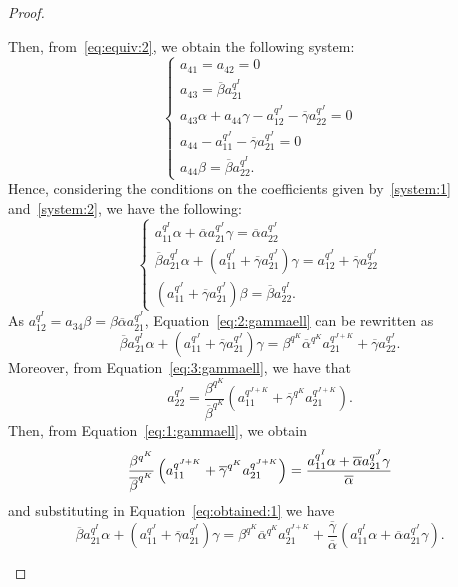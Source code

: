 \documentclass[11pt]{article}
\theoremstyle{definition}
\numberwithin{equation}{section}
\begin{document}
\begin{proof}
\begin{enumerate}
Then, from~\eqref{eq:equiv:2}, we obtain the following system:
\begin{equation}
\label{system:2}
    \begin{cases}
        a_{41} = a_{42} = 0\\
        a_{43} = \overline{\beta}a_{21}^{q^I}\\
        a_{43}\alpha + a_{44}\gamma - a_{12}^{q^J} - \overline{\gamma}a_{22}^{q^J} = 0\\
        a_{44} - a_{11}^{q^J} - \overline{\gamma}a_{21}^{q^J} = 0\\
        a_{44}\beta = \overline{\beta}a_{22}^{q^I}.
    \end{cases}
\end{equation}
Hence, considering the conditions on the coefficients {given by~\eqref{system:1} and~\eqref{system:2},} 
we have the following:
   $$ \begin{cases}
    a_{11}^{q^I}\alpha + \overline{\alpha}a_{21}^{q^J}\gamma = \overline{\alpha}a_{22}^{q^J} \label{eq:1:gammaell}\\
    \overline{\beta}a_{21}^{q^I}\alpha + \left(a_{11}^{q^J} + \overline{\gamma}a_{21}^{q^J}\right)\gamma = a_{12}^{q^J} + \overline{\gamma}a_{22}^{q^J} \label{eq:2:gammaell}\\
    \left(a_{11}^{q^J} + \overline{\gamma}a_{21}^{q^J}\right)\beta = \overline{\beta}a_{22}^{q^I}. \label{eq:3:gammaell}
    \end{cases}$$
As $a_{12}^{q^I} = a_{34}\beta = \beta\overline{\alpha}a_{21}^{q^J}$, Equation~\eqref{eq:2:gammaell} can be rewritten as 
\begin{equation}
\label{eq:obtained:1}
    \overline{\beta}a_{21}^{q^I}\alpha + \left(a_{11}^{q^J} + \overline{\gamma}a_{21}^{q^J}\right)\gamma = \beta^{q^K}\overline{\alpha}^{q^K}a_{21}^{q^{J+K}} + \overline{\gamma}a_{22}^{q^J}.
\end{equation}
Moreover, from Equation~\eqref{eq:3:gammaell}, we have that
\begin{equation*}
  a_{22}^{q^J} = \frac{\beta^{q^K}}{\overline{\beta}^{q^K}}\left(a_{11}^{q^{J+K}} + \overline{\gamma}^{q^K}a_{21}^{q^{J+K}}\right).
\end{equation*}
Then, from Equation~\eqref{eq:1:gammaell}, we obtain
\begin{equation}
\label{eq:obtained:a_{22}}
\frac{\beta^{q^K}}{\overline{\beta}^{q^K}}\left(a_{11}^{q^{J+K}} + \overline{\gamma}^{q^K}a_{21}^{q^{J+K}}\right) = \frac{a_{11}^{q^I}\alpha + \overline{\alpha}a_{21}^{q^J}\gamma}{\overline{\alpha}}
\end{equation}
and substituting in Equation~\eqref{eq:obtained:1} we have
\begin{equation}
\label{eq:obtained:2}
    \overline{\beta}a_{21}^{q^I}\alpha + \left(a_{11}^{q^J} + \overline{\gamma}a_{21}^{q^J}\right)\gamma = \beta^{q^K}\overline{\alpha}^{q^K}a_{21}^{q^{J+K}} + \frac{\overline{\gamma}}{\overline{\alpha}}\left(a_{11}^{q^I}\alpha + \overline{\alpha}a_{21}^{q^J}\gamma\right).
\end{equation}


\end{enumerate}
\end{proof}
\end{document}
